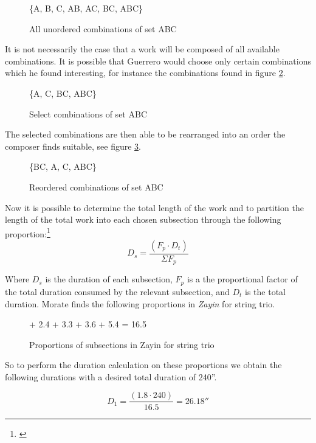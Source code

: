 \begin{figure}[H]
    \centering
    \{A, B, C, AB, AC, BC, ABC\}
    \caption{All unordered combinations of set ABC}
    \label{fig:ABC-combinations}
\end{figure}

It is not necessarily the case that a work will be composed of all available combinations. It is possible that Guerrero would choose only certain combinations which he found interesting, for instance the combinations found in figure \ref{fig:ABC-select-combinations}.

\begin{figure}[H]
    \centering
    \{A, C, BC, ABC\}
    \caption{Select combinations of set ABC}
    \label{fig:ABC-select-combinations}
\end{figure}

The selected combinations are then able to be rearranged into an order the composer finds suitable, see figure \ref{fig:ABC-reordered-combinations}.

\begin{figure}[H]
    \centering
    \{BC, A, C, ABC\}
    \caption{Reordered combinations of set ABC}
    \label{fig:ABC-reordered-combinations}
\end{figure}

Now it is possible to determine the total length of the work and to partition the length of the total work into each chosen subsection through the following proportion:\footnote{\citet[150-151]{guerreropaper}}
\begin{equation}
    D_s = \frac{(F_p \cdot D_t)}{\Sigma F_p}
    \label{eq:guerrero-proportions}
\end{equation}

Where $D_s$ is the duration of each subsection, $F_p$ is a the proportional factor of the total duration consumed by the relevant subsection, and $D_t$ is the total duration. Morate finds the following proportions in \textit{Zayin} for string trio.

\begin{figure}[H]
     + 2.4 + 3.3 + 3.6 + 5.4 = 16.5
    \caption{Proportions of subsections in Zayin for string trio}
    \label{fig:zayin proportions}
\end{figure}

So to perform the duration calculation on these proportions we obtain the following durations with a desired total duration of 240''.

\begin{equation}
    D_1 = \frac{(1.8 \cdot 240)}{16.5} = 26.18''
\end{equation}

